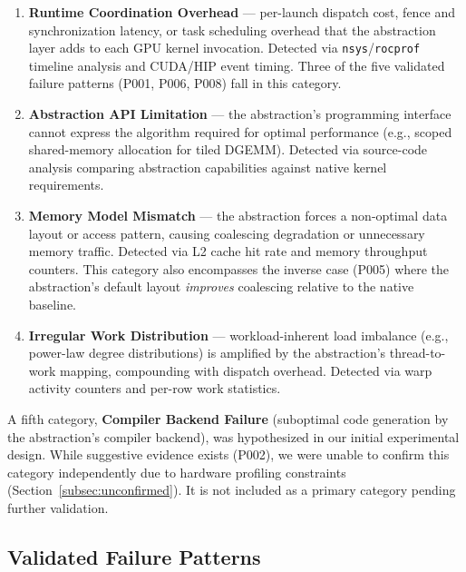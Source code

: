 \begin{enumerate}
    \item \textbf{Runtime Coordination Overhead} --- per-launch dispatch cost,
          fence and synchronization latency, or task scheduling overhead that
          the abstraction layer adds to each GPU kernel invocation. Detected
          via \texttt{nsys}/\texttt{rocprof} timeline analysis and CUDA/HIP
          event timing. Three of the five validated failure patterns (P001,
          P006, P008) fall in this category.

    \item \textbf{Abstraction API Limitation} --- the abstraction's programming
          interface cannot express the algorithm required for optimal
          performance (e.g., scoped shared-memory allocation for tiled DGEMM).
          Detected via source-code analysis comparing abstraction capabilities
          against native kernel requirements.

    \item \textbf{Memory Model Mismatch} --- the abstraction forces a
          non-optimal data layout or access pattern, causing coalescing
          degradation or unnecessary memory traffic. Detected via L2 cache hit
          rate and memory throughput counters. This category also encompasses
          the inverse case (P005) where the abstraction's default layout
          \emph{improves} coalescing relative to the native baseline.

    \item \textbf{Irregular Work Distribution} --- workload-inherent load
          imbalance (e.g., power-law degree distributions) is amplified by the
          abstraction's thread-to-work mapping, compounding with dispatch
          overhead. Detected via warp activity counters and per-row work
          statistics.
\end{enumerate}

\noindent A fifth category, \textbf{Compiler Backend Failure} (suboptimal code
generation by the abstraction's compiler backend), was hypothesized in our
initial experimental design. While suggestive evidence exists (P002), we were
unable to confirm this category independently due to hardware profiling
constraints (Section~\ref{subsec:unconfirmed}). It is not included as a
primary category pending further validation.

\subsection{Validated Failure Patterns}
\label{subsec:failure_patterns}

